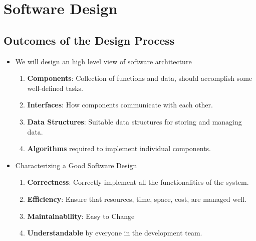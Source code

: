 \documentclass[a4paper]{article}
\begin{document}
\section{Software Design}
\subsection{Outcomes of the Design Process}
\begin{itemize}
    \item We will design an high level view of software architecture
    \begin{enumerate}
        \item \textbf{Components}: Collection of functions and data, should accomplish some well-defined tasks.
        \item \textbf{Interfaces}: How components communicate with each other.
        \item \textbf{Data Structures}: Suitable data structures for storing and managing data.
        \item \textbf{Algorithms} required to implement individual components.
    \end{enumerate}
    \item Characterizing a Good Software Design
    \begin{enumerate}
        \item \textbf{Correctness}: Correctly implement all the functionalities of the system.
        \item \textbf{Efficiency}: Ensure that resources, time, space, cost, are managed well.
        \item \textbf{Maintainability}: Easy to Change
        \item \textbf{Understandable} by everyone in the development team.
    \end{enumerate}
\end{itemize}
\end{document}
